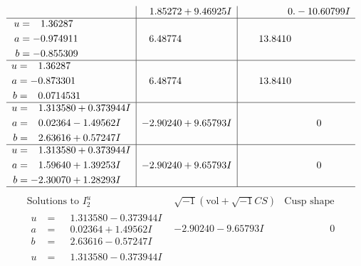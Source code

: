 \documentclass[1p]{elsarticle_modified}
\theoremstyle{definition}
\newcommand{\I}{\sqrt{-1}}
\begin{document}
$$\begin{array}{c|c|c}
 & \phantom{-}1.85272 + 9.46925 I & \phantom{-0.000000 } 0. - 10.60799 I \\ \hline\begin{aligned}
u &= \phantom{-}1.36287\phantom{ +0.000000I} \\
a &= -0.974911\phantom{ +0.000000I} \\
b &= -0.855309\phantom{ +0.000000I}\end{aligned}
 & \phantom{-}6.48774\phantom{ +0.000000I} & \phantom{-}13.8410\phantom{ +0.000000I} \\ \hline\begin{aligned}
u &= \phantom{-}1.36287\phantom{ +0.000000I} \\
a &= -0.873301\phantom{ +0.000000I} \\
b &= \phantom{-}0.0714531\phantom{ +0.000000I}\end{aligned}
 & \phantom{-}6.48774\phantom{ +0.000000I} & \phantom{-}13.8410\phantom{ +0.000000I} \\ \hline\begin{aligned}
u &= \phantom{-}1.313580 + 0.373944 I \\
a &= \phantom{-}0.02364 - 1.49562 I \\
b &= \phantom{-}2.63616 + 0.57247 I\end{aligned}
 & -2.90240 + 9.65793 I & \phantom{-0.000000 } 0 \\ \hline\begin{aligned}
u &= \phantom{-}1.313580 + 0.373944 I \\
a &= \phantom{-}1.59640 + 1.39253 I \\
b &= -2.30070 + 1.28293 I\end{aligned}
 & -2.90240 + 9.65793 I & \phantom{-0.000000 } 0\\
 \hline 
 \end{array}$$\newpage$$\begin{array}{c|c|c}  
\text{Solutions to }I^u_{2}& \I (\text{vol} + \sqrt{-1}CS) & \text{Cusp shape}\\
 \hline 
\begin{aligned}
u &= \phantom{-}1.313580 - 0.373944 I \\
a &= \phantom{-}0.02364 + 1.49562 I \\
b &= \phantom{-}2.63616 - 0.57247 I\end{aligned}
 & -2.90240 - 9.65793 I & \phantom{-0.000000 } 0 \\ \hline\begin{aligned}
u &= \phantom{-}1.313580 - 0.373944 I \\

\end{aligned}
\end{array}$$
\end{document}
